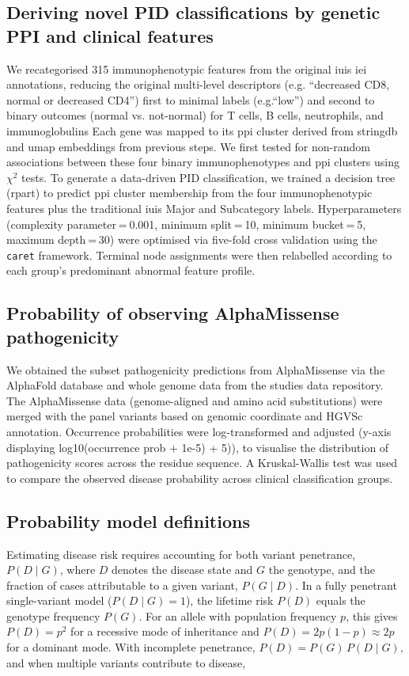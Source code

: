 \subsection{Deriving novel PID classifications by genetic PPI and clinical features}
We recategorised 315 immunophenotypic features from the original \ac{iuis} \ac{iei} annotations, reducing the original multi-level descriptors (e.g. ``decreased CD8, normal or decreased CD4'') first to 
minimal labels (e.g.``low'') and second to binary outcomes (normal vs. not-normal) for T cells, B cells, neutrophils, and immunoglobulins %
Each gene was mapped to its \ac{ppi} cluster derived from \ac{stringdb} and \ac{umap} embeddings from previous steps. 
We first tested for non-random associations between these four binary immunophenotypes and \ac{ppi} clusters using $\chi^2$ tests. %
To generate a data-driven PID classification, we trained a decision tree (rpart) to predict \ac{ppi} cluster membership from the four immunophenotypic features plus the traditional \ac{iuis} Major and Subcategory labels. 
Hyperparameters (complexity parameter = 0.001, minimum split = 10, minimum bucket = 5, maximum depth = 30) were optimised via five-fold cross validation using the \texttt{caret} framework. 
Terminal node assignments were then relabelled according to each group’s predominant abnormal feature profile.

\subsection{Probability of observing AlphaMissense pathogenicity}
We obtained the subset pathogenicity predictions from AlphaMissense via the AlphaFold database and whole genome data from the studies data repository\cite{cheng_accurate_2023, jun_cheng_2023_8208688}. 
The AlphaMissense data (genome-aligned and amino acid substitutions) were merged with the panel variants based on genomic coordinate and HGVSc annotation. 
Occurrence probabilities were log-transformed and adjusted (y-axis displaying log10(occurrence prob + 1e-5) + 5)), to visualise the distribution of pathogenicity scores across the residue sequence. 
A Kruskal-Wallis test was used to compare the observed disease probability across clinical classification groups.

\subsection{Probability model definitions}
Estimating disease risk requires accounting for both variant penetrance, $P(D\mid G)$, where $D$ denotes the disease state and $G$ the genotype, and the fraction of cases attributable to a given variant, $P(G\mid D)$. In a fully penetrant single-variant model ($P(D\mid G)=1$), the lifetime risk $P(D)$ equals the genotype frequency $P(G)$. For an allele with population frequency $p$, this gives $P(D)=p^2$ for a recessive mode of inheritance and $P(D)=2p(1-p)\approx2p$ for a dominant mode. With incomplete penetrance, $P(D)=P(G)\,P(D\mid G)$, and when multiple variants contribute to disease,  

